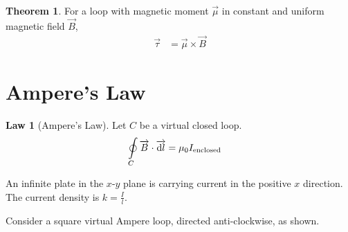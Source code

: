 \documentclass[fleqn, a4paper, 8pt, twoside]{amsart}
\theoremstyle{definition}
\theoremstyle{theorem}
\newtheorem{theorem}{Theorem}
\newtheorem{law}{Law}
\begin{document}
\begin{multicols}{2}
\begin{spacing}{0.6}
\begin{theorem}
	For a loop with magnetic moment $\overrightarrow{\mu}$ in constant and uniform magnetic field $\overrightarrow{B}$,
	\begin{align*}
		\overrightarrow{\tau} &= \overrightarrow{\mu} \times \overrightarrow{B}
	\end{align*}
\end{theorem}

\section{Ampere's Law}

\begin{law}[Ampere's Law]
	Let $C$ be a virtual closed loop.
	\begin{align*}
		\oint\limits_{C} \overrightarrow{B} \cdot \overrightarrow{\dif l} &= \mu_0 I_{\textnormal{enclosed}}
	\end{align*}
	\label{Ampere's_Law}
\end{law}

\begin{question}
	An infinite plate in the $x$-$y$ plane is carrying current in the positive $x$ direction.
	The current density is $k = \frac{I}{l}$.
\end{question}

\begin{solution}
	Consider a square virtual Ampere loop, directed anti-clockwise, as shown.
	\begin{figure}[H]
\end{figure}
\end{solution}
\end{spacing}
\end{multicols}
\end{document}
